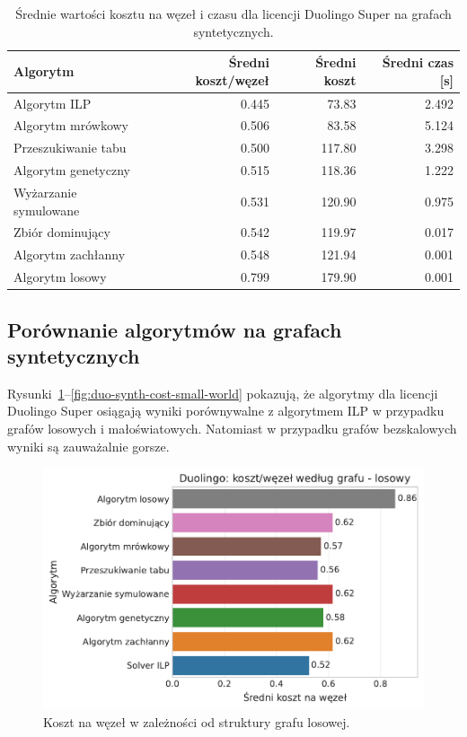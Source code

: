 \begin{table}[H]
  \centering
  \caption{Średnie wartości kosztu na węzeł i czasu dla licencji Duolingo Super na grafach syntetycznych.}
  \label{tab:duo-synth-summary}
  \begin{tabular}{lrrr}
    \toprule
    \textbf{Algorytm}     & \textbf{Średni koszt/węzeł} & \textbf{Średni koszt} & \textbf{Średni czas [s]} \\
    \midrule
    Algorytm ILP          & 0.445                       & 73.83                 & 2.492                    \\
    Algorytm mrówkowy     & 0.506                       & 83.58                 & 5.124                    \\
    Przeszukiwanie tabu   & 0.500                       & 117.80                & 3.298                    \\
    Algorytm genetyczny   & 0.515                       & 118.36                & 1.222                    \\
    Wyżarzanie symulowane & 0.531                       & 120.90                & 0.975                    \\
    Zbiór dominujący      & 0.542                       & 119.97                & 0.017                    \\
    Algorytm zachłanny    & 0.548                       & 121.94                & 0.001                    \\
    Algorytm losowy       & 0.799                       & 179.90                & 0.001                    \\
    \bottomrule
  \end{tabular}
\end{table}


\subsection{Porównanie algorytmów na grafach syntetycznych}

Rysunki~\ref{fig:duo-synth-cost-random}--\ref{fig:duo-synth-cost-small-world} pokazują, że algorytmy dla licencji Duolingo Super osiągają wyniki porównywalne z algorytmem ILP w przypadku grafów losowych i małoświatowych. Natomiast w przypadku grafów bezskalowych wyniki są zauważalnie gorsze.


\begin{figure}[H]
  \centering
  \includegraphics[width=0.65\linewidth]{assets/figures/benchmark/synthetic/duolingo_cost_per_node_by_graph_random.pdf}
  \caption{Koszt na węzeł w zależności od struktury grafu losowej.}
  \label{fig:duo-synth-cost-random}
\end{figure}

